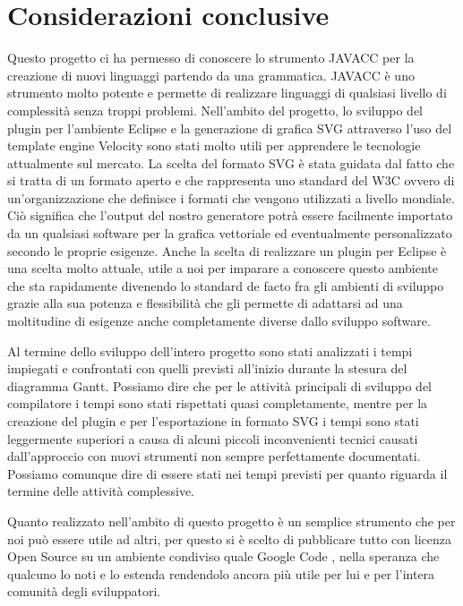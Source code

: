 \chapter{Considerazioni conclusive}

Questo progetto ci ha permesso di conoscere lo strumento JAVACC per la
creazione di nuovi linguaggi partendo da una grammatica. JAVACC è uno strumento
molto potente e permette di realizzare linguaggi di qualsiasi livello di
complessità senza troppi problemi.
Nell'ambito del progetto, lo sviluppo del plugin per l'ambiente Eclipse e la
generazione di grafica SVG attraverso l'uso del template engine Velocity sono
stati molto utili per apprendere le tecnologie attualmente sul mercato.
La scelta del formato SVG è stata guidata dal fatto che si tratta di un formato
aperto e che rappresenta uno standard del W3C ovvero di un'organizzazione che
definisce i formati che vengono utilizzati a livello mondiale. Ciò significa che
l'output del nostro generatore potrà essere facilmente importato da un qualsiasi
software per la grafica vettoriale ed eventualmente personalizzato secondo le
proprie esigenze.
Anche la scelta di realizzare un plugin per Eclipse è una scelta molto attuale,
utile a noi per imparare a conoscere questo ambiente che sta rapidamente
divenendo lo standard de facto fra gli ambienti di sviluppo grazie alla sua
potenza e flessibilità che gli permette di adattarsi ad una moltitudine di
esigenze anche completamente diverse dallo sviluppo software.


Al termine dello sviluppo dell'intero progetto sono stati analizzati i
tempi impiegati e confrontati con quelli previsti all'inizio durante la stesura
del diagramma Gantt. Possiamo dire che per le attività principali di sviluppo
del compilatore i tempi sono stati rispettati quasi completamente, mentre per la
creazione del plugin e per l'esportazione in formato SVG i tempi sono stati
leggermente superiori a causa di alcuni piccoli inconvenienti tecnici causati
dall'approccio con nuovi strumenti non sempre perfettamente documentati.
Possiamo comunque dire di essere stati nei tempi previsti per quanto riguarda il
termine delle attività complessive.


Quanto realizzato nell'ambito di questo progetto è un semplice
strumento
che per noi può essere utile ad altri, per questo si è scelto di pubblicare
tutto con licenza Open Source su un ambiente condiviso quale Google Code
\cite{google_code_website:10}, nella speranza che qualcuno lo noti e lo estenda
rendendolo ancora più utile per lui e per l'intera comunità degli sviluppatori.

